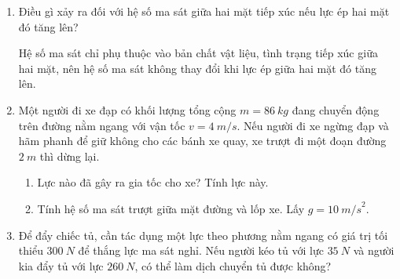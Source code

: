 \begin{enumerate}[label=\bfseries Câu \arabic*:]
	
	\item {}
	
	
	{Điều gì xảy ra đối với hệ số ma sát giữa hai mặt tiếp xúc nếu lực ép hai mặt đó tăng lên?
	}
	
	\hideall
	{Hệ số ma sát chỉ phụ thuộc vào bản chất vật liệu, tình trạng tiếp xúc giữa hai mặt, nên hệ số ma sát không thay đổi khi lực ép giữa hai mặt đó tăng lên.
	}
	\item {}
	
	{
		Một người đi xe đạp có khối lượng tổng cộng $m = \SI{86}{kg}$ đang chuyển động trên đường nằm ngang với vận tốc $v = \SI{4}{m/s}$. Nếu người đi xe ngừng đạp và hãm phanh để giữ không cho các bánh xe quay, xe trượt đi một đoạn đường $\SI{2}{m}$ thì dừng lại.
		\begin{enumerate}[label=\alph*)]
			\item Lực nào đã gây ra gia tốc cho xe? Tính lực này.
			\item Tính hệ số ma sát trượt giữa mặt đường và lốp xe. Lấy $g = \SI{10}{m/s}^2$.
		\end{enumerate}
	}
	
	\item {}
	
	{
		Để đẩy chiếc tủ, cần tác dụng một lực theo phương nằm ngang có giá trị tối thiểu $\SI{300}{N}$ để thắng lực ma sát nghỉ. Nếu người kéo tủ với lực $\SI{35}{N}$ và người kia đẩy tủ với lực $\SI{260}{N}$, có thể làm dịch chuyển tủ được không?
	}
	

\end{enumerate}
